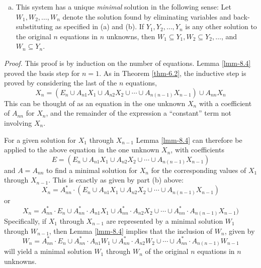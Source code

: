 \begin{lmm}
\begin{enumerate}[a.]
\item This system has a unique \emph{minimal} solution in the following sense:
Let $W_1,W_2,\ldots,W_n$ denote the solution found by eliminating variables and
back-substituting as specified in (a) and (b). If $Y_1,Y_2,\ldots,Y_n$ is any
other solution to the original $n$ equations in $n$ unknowns, then $W_1\subseteq
Y_1,W_2\subseteq Y_2,\ldots$, and $W_n\subseteq Y_n$.
\end{enumerate}

\emph{Proof.} This proof is by induction on the number of equations. Lemma \ref{lmm-8.4}
proved the basis step for $n=1$. As in Theorem \ref{thm-6.2}, the inductive step is proved
by considering the last of the $n$ equations,
\[ X_n = (E_n\cup A_{n1}X_1\cup A_{n2}X_2\cup\cdots\cup A_{n(n-1)}X_{n-1})\cup
	A_{nn}X_n \]
This can be thought of as an equation in the one unknown $X_n$ with a coefficient
of $A_{nn}$ for $X_n$, and the remainder of the expression a ``constant'' term
not involving $X_n$.

For a given solution for $X_1$ through $X_{n-1}$ Lemma \ref{lmm-8.4} can therefore be
applied to the above equation in the one unknown $X_n$, with coefficients
\[ E = (E_n\cup A_{n1}X_1\cup A_{n2}X_2\cup\cdots\cup A_{n(n-1)}X_{n-1}) \]
and $A=A_{nn}$ to find a minimal solution for $X_n$ for the corresponding values of
$X_1$ through $X_{n-1}$. This is exactly as given by part (b) above:
\[ X_n=A^*_{nn}\cdot(E_n\cup A_{n1}X_1\cup A_{n2}X_2\cup\cdots\cup A_{n(n-1)}
	X_{n-1}) \]
or
\[ X_n = A^*_{nn}\cdot E_n\cup A^*_{nn}\cdot A_{n1}X_1\cup A^*_{nn}\cdot A_{n2}
	X_2\cup\cdots\cup A^*_{nn}\cdot A_{n(n-1)}X_{n-1}) \]
Specifically, if $X_1$ through $X_{n-1}$ are represented by a minimal solution
$W_1$ through $W_{n-1}$, then Lemma \ref{lmm-8.4} implies that the inclusion of $W_n$,
given by
\[ W_n = A^*_{nn}\cdot E_n\cup A^*_{nn}\cdot A_{n1}W_1\cup A^*_{nn}\cdot A_{n2}
	W_2\cup\cdots\cup A^*_{nn}\cdot A_{n(n-1)}W_{n-1} \]
will yield a minimal solution $W_1$ through $W_n$ of the original $n$ equations
in $n$ unknowns.


\end{lmm}
